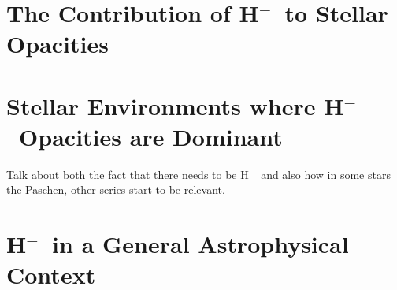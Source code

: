 \documentclass{emulateapj}
\def\h{H$^-$}
\begin{document}
\section{The Contribution of \h\ to Stellar Opacities}


\section{Stellar Environments where \h\ Opacities are Dominant}
Talk about both the fact that there needs to be \h\ and also how in
some stars the Paschen, other series start to be relevant.

\section{\h\ in a General Astrophysical Context}





\end{document}
